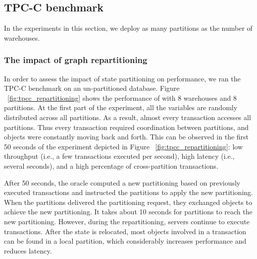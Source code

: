 
\subsection{TPC-C benchmark}
\label{sec:evaluation:tpc-c}

In the experiments in this section, we deploy as many partitions as the number of warehouses.

\subsubsection{The impact of graph repartitioning}
In order to assess the impact of state partitioning on performance, we ran the TPC-C benchmark on an 
un-partitioned database.  Figure ~\ref{fig:tpcc_repartitioning} 
shows the performance of \dynastar with 8 warehouses and 8 partitions.
At the first part of the experiment, all the variables are randomly distributed across all partitions.
As a result, almost every transaction accesses all partitions. Thus every transaction 
required coordination between partitions, and objects were constantly moving back and forth. 
This can be observed in the first 50 seconds of the experiment depicted in Figure 
~\ref{fig:tpcc_repartitioning}: low throughput (i.e., a few transactions executed per second), 
high latency (i.e., several seconds), and a high percentage of cross-partition transactions.



After 50 seconds, the oracle computed a new partitioning based on previously executed transactions 
and instructed the partitions to apply the new partitioning.
When the partitions delivered the partitioning request, they exchanged objects to achieve the new partitioning.
It takes about 10 seconds for partitions to reach the new partitioning.
However, during the repartitioning, servers continue to execute transactions.
After the state is relocated, most objects involved in a transaction
can be found in a local partition, which considerably increases performance and reduces latency. 

